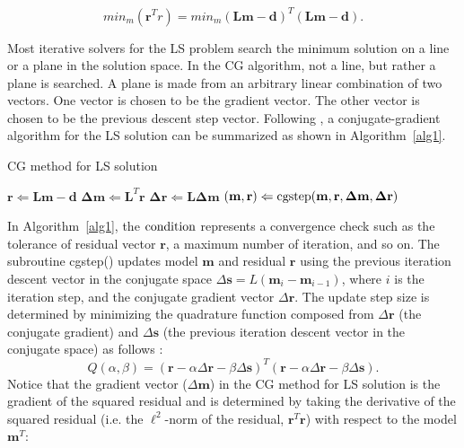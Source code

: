 \begin{equation}
 min_m ({\mathbf r^T r}) = min_m {(\mathbf L\mathbf m - \mathbf d)^T(\mathbf L\mathbf m - \mathbf d)} .
\end{equation}

Most iterative solvers for the LS problem search the minimum solution
on a line or a plane in the solution space.  In the CG algorithm, not
a line, but rather a plane is searched.  A plane is made from an
arbitrary linear combination of two vectors.  One vector is chosen to
be the gradient vector.  The other vector is chosen to be the previous
descent step vector.  Following \cite{ClaerPVI:92}, a
conjugate-gradient algorithm for the LS solution can be summarized as
shown in Algorithm~\ref{alg1}.

\begin{algorithm}
\caption{ CG method for LS solution}
\label{alg1}
\begin{algorithmic}
\STATE $ {\mathbf r} \Leftarrow \mathbf L \mathbf m - \mathbf d $
\STATE $ \mathbf \Delta \mathbf m \Leftarrow \mathbf L^T \mathbf r $
\STATE $ \mathbf \Delta \mathbf r \Leftarrow \mathbf L \mathbf \Delta \mathbf m $
\STATE $ (\mathbf m, \mathbf r) \Leftarrow \rm cgstep(\mathbf m, \mathbf r, \mathbf \Delta \mathbf m, \mathbf \Delta \mathbf r)  $
\ENDWHILE
\end{algorithmic}
\end{algorithm}

In Algorithm~\ref{alg1}, the $\rm condition$ represents a convergence check
such as the tolerance of residual vector $\mathbf r$, 
a maximum number of iteration, and so on.
The subroutine {\mbox cgstep()} updates model $\mathbf m$ and residual $\mathbf r$
using the previous iteration descent vector in the conjugate space 
$\Delta \mathbf s = L (\mathbf m_i - \mathbf m_{i-1})$, where $i$ is the iteration step,
and the conjugate gradient vector $\Delta \mathbf r$.
The update step size is determined by minimizing 
the quadrature function composed from 
$\Delta \mathbf r$ (the conjugate gradient) 
and $\Delta \mathbf s$ (the previous iteration descent vector in the conjugate space)
as follows \cite{ClaerPVI:92}:
$$Q(\alpha,\beta) = (\mathbf r-\alpha \Delta \mathbf r -\beta \Delta \mathbf s)^T
                    (\mathbf r-\alpha \Delta \mathbf r -\beta \Delta \mathbf s) .$$ 
Notice that
the gradient vector ($\Delta \mathbf m$) in the CG method for LS solution 
is the gradient of the squared residual 
and is determined by taking the derivative of the squared residual
(i.e. the $\ell^2$-norm of the residual, $\mathbf r^T \mathbf r$)
with respect to the model $\mathbf m^T$:

